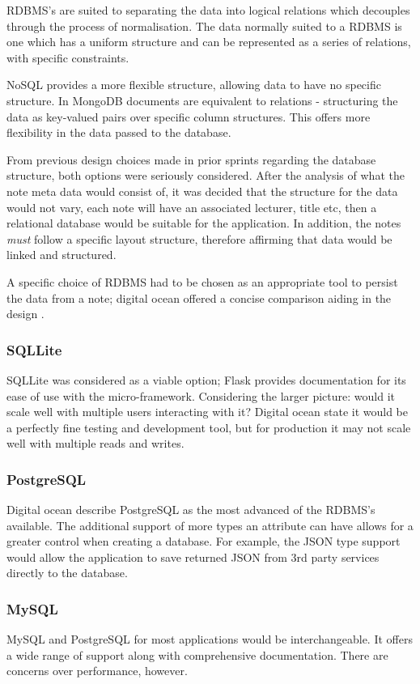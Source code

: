 RDBMS's are suited to separating the data into logical relations which decouples through the process of normalisation. The data normally suited to a RDBMS is one which has a uniform structure and can be represented as a series of relations, with specific constraints.

NoSQL provides a more flexible structure, allowing data to have no specific structure. In MongoDB \cite{citeulike:14019766} documents are equivalent to relations - structuring the data as key-valued pairs over specific column structures. This offers more flexibility in the data passed to the database.

From previous design choices made in prior sprints regarding the database structure, both options were seriously considered. After the analysis of what the note meta data would consist of, it was decided that the structure for the data would not vary, each note will have an associated lecturer, title etc, then a relational database would be suitable for the application. In addition, the notes \textit{must} follow a specific layout structure, therefore affirming that data would be linked and structured.

A specific choice of RDBMS had to be chosen as an appropriate tool to persist the data from a note; digital ocean offered a concise comparison aiding in the design \cite{citeulike:14019772}.
\subsubsection{SQLLite}
SQLLite was considered as a viable option; Flask provides documentation for its ease of use with the micro-framework. Considering the larger picture: would it scale well with multiple users interacting with it? Digital ocean state it would be a perfectly fine testing and development tool, but for production it may not scale well with multiple reads and writes.
\subsubsection{PostgreSQL}
Digital ocean describe PostgreSQL as the most advanced of the RDBMS's available. The additional support of more types an attribute can have allows for a greater control when creating a database. For example, the JSON type support would allow the application to save returned JSON from 3rd party services directly to the database.
\subsubsection{MySQL}
MySQL and PostgreSQL for most applications would be interchangeable. It offers a wide range of support along with comprehensive documentation. There are concerns over performance, however.

